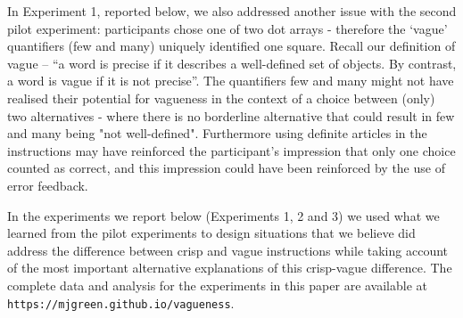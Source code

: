 In Experiment 1, reported below, we also addressed another issue with the second pilot experiment: participants chose one of two dot arrays - therefore the `vague' quantifiers (few and many) uniquely identified one square. Recall our definition of vague  -- ``a word is precise if it describes a well-defined set of objects. By contrast, a word is vague if it is not precise''. The quantifiers few and many might not have realised their potential for vagueness in the context of a choice between (only) two alternatives - where there is no borderline alternative that could result in few and many being "not well-defined". Furthermore using definite articles in the instructions may have reinforced the participant's impression that only one choice counted as correct, and this impression could have been reinforced by the use of error feedback.

In the experiments we report below (Experiments 1, 2 and 3) we used what we learned from the pilot experiments to design situations that we believe did address the difference between crisp and vague instructions while taking account of the most important alternative explanations of this crisp-vague difference. The complete data and analysis for the experiments in this paper are available at \texttt{https://mjgreen.github.io/vagueness}.



